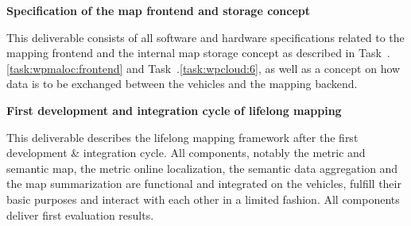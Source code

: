{\begin{deliverables}{\WPMappingNo}
\item {\bf Specification of the map frontend and storage concept}  
\delresponsible{\ETHZ}

This deliverable consists of all software and hardware specifications related to the mapping frontend and the internal map storage concept as described in Task~\WPMappingNo.\ref{task:wpmaloc:frontend} and Task~\WPMappingNo.\ref{task:wpcloud:6}, as well as a concept on how data is to be exchanged between the vehicles and the mapping backend.


%
%	
%
%
%
%	

\item {\bf First development and integration cycle of lifelong mapping} 
\delresponsible{\ETHZ}
\label{del:maloc:cycle1}

This deliverable describes the lifelong mapping framework after the first development \& integration cycle. All components, notably the metric and semantic map, the metric online localization, the semantic data aggregation and the map summarization are functional and integrated on the vehicles, fulfill their basic purposes and interact with each other in a limited fashion. All components deliver first evaluation results.


\end{deliverables}}
